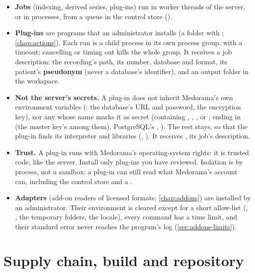 \begin{itemize}
\item \textbf{Jobs} (indexing, derived series, plug-ins) run in worker threads of the server, or
  in  processes, from a queue in the control store ().
\item \textbf{Plug-ins} are programs that an administrator installs (a folder with
  ; \cref{chap:actions}). Each run is a child process in its own process group,
  with a timeout; cancelling or timing out kills the whole group. It receives a job description:
  the recording's path, its number, database and format, its patient's \textbf{pseudonym} (never a database's
  identifier), and an output folder in the workspace.
\item \textbf{Not the server's secrets.} A plug-in does not inherit Medorama's own environment
  variables (: the database's URL and password, the encryption key), nor any
  whose name marks it as secret (containing , , ,
   or , ending in  (the master key's
   among them), PostgreSQL's
  , ). The rest stays, so that the plug-in finds its
  interpreter and libraries (, ). It receives
  , its job's description.
\item \textbf{Trust.} A plug-in runs with Medorama's operating-system rights: it is trusted
  code, like the server. Install only plug-ins you have reviewed. Isolation is by process, not a
  sandbox: a plug-in can still read what Medorama's account can, including the control store and
  a .
\item \textbf{Adapters} (add-on readers of licensed formats; \cref{chap:addons}) are installed by
  an administrator. Their environment is cleared except for a short allow-list (,
  , the temporary folders, the locale), every command has a time limit, and their
  standard error never reaches the program's log (\cref{sec:addons-limits}).
\end{itemize}

\section{Supply chain, build and repository}
\label{sec:security-supply}

